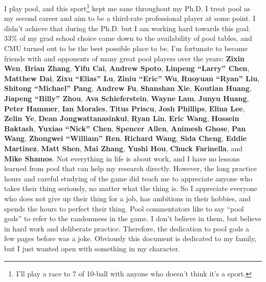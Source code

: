 I play pool, and this sport\footnote{I'll play a race to 7 of 10-ball with anyone who doesn't think it's a sport.} kept me sane throughout my Ph.D. I treat pool as my second career and aim to be a third-rate professional player at some point. I didn't achieve that during the Ph.D. but I am working hard towards this goal. 33\% of my grad school choice came down to the availability of pool tables, and CMU turned out to be the best possible place to be. I'm fortunate to become friends with and opponents of many great pool players over the years: \textbf{Zixin Wen}, \textbf{Brian Zhang}, \textbf{Yifu Cai}, \textbf{Andrew Spoto}, \textbf{Linpeng ``Larry'' Chen}, \textbf{Matthew Dai}, \textbf{Zixu ``Elias'' Lu}, \textbf{Ziniu ``Eric'' Wu}, \textbf{Ruoyuan ``Ryan'' Liu}, \textbf{Shitong ``Michael'' Pang}, \textbf{Andrew Fu}, \textbf{Shanshan Xie}, \textbf{Koutian Huang}, \textbf{Jiapeng ``Billy'' Zhou}, \textbf{Ava Schieferstein}, \textbf{Wayne Lam}, \textbf{Junyu Huang}, \textbf{Peter Hammer}, \textbf{Ian Morales}, \textbf{Titus Priscu}, \textbf{Josh Phillips}, \textbf{Elina Lee}, \textbf{Zelin Ye}, \textbf{Dean Jongwattanasinkul}, \textbf{Ryan Lin}, \textbf{Eric Wang}, \textbf{Hossein Baktash}, \textbf{Yuxiao ``Nick'' Chen}, \textbf{Spencer Allen}, \textbf{Animesh Ghose}, \textbf{Pan Wang}, \textbf{Zhongwei ``William'' Ren}, \textbf{Richard Wang}, \textbf{Sida Cheng}, \textbf{Eddie Martinez}, \textbf{Matt Shen}, \textbf{Mai Zhang}, \textbf{Yushi Hou}, \textbf{Chuck Farinella}, and \textbf{Mike Shamos}. Not everything in life is about work, and I have no lessons learned from pool that can help my research directly. However, the long practice hours and careful studying of the game did teach me to appreciate anyone who takes their thing seriously, no matter what the thing is. So I appreciate everyone who does not give up their thing for a job, has ambitions in their hobbies, and spends the hours to perfect their thing. Pool commentators like to say ``pool gods'' to refer to the randomness in the game. I don't believe in them, but believe in hard work and deliberate practice. Therefore, the dedication to pool gods a few pages before was a joke. Obviously this document is dedicated to my family, but I just wanted open with something in my character.


